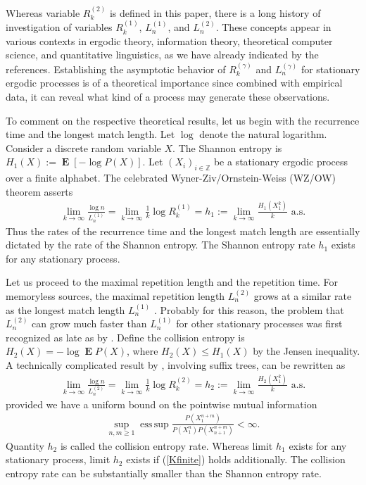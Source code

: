 \documentclass[a4paper]{article}
\newcommand{\kwad}[1]{\left[ #1 \right]}
\DeclareMathOperator{\esssup}{ess\, sup}
\DeclareMathOperator{\mean}{\mathbf{E}}
\begin{document}
Whereas variable $R^{(2)}_k$ is defined in this paper, there is a long
history of investigation of variables $R^{(1)}_k$, $L^{(1)}_n$, and
$L^{(2)}_n$. These concepts appear in various contexts in ergodic
theory, information theory, theoretical computer science, and
quantitative linguistics, as we have already indicated by the
references.  Establishing the asymptotic behavior of $R^{(\gamma)}_k$
and $L^{(\gamma)}_n$ for stationary ergodic processes is of a theoretical
importance since combined with empirical data, it can reveal what kind
of a process may generate these observations.

To comment on the respective theoretical results, let us begin with
the recurrence time and the longest match length.  Let $\log$ denote
the natural logarithm.  Consider a discrete random variable $X$. The
Shannon entropy is $H_1(X):=\mean\kwad{-\log P(X)}$. Let
$(X_i)_{i\in\mathbb{Z}}$ be a stationary ergodic process over a finite
alphabet. The celebrated Wyner-Ziv/Ornstein-Weiss (WZ/OW) theorem
\citep{WynerZiv89,OrnsteinWeiss93} asserts
\begin{align}
  \label{WZOW}
  \lim_{k\to\infty} \frac{\log n}{L^{(1)}_n}
  =\lim_{k\to\infty} \frac{1}{k}\log R^{(1)}_k
  =h_1:=\lim_{k\to\infty} \frac{H_1(X_1^k)}{k}
  \text{ a.s.}
\end{align}
Thus the rates of the recurrence time and the longest match length are
essentially dictated by the rate of the Shannon entropy.  The Shannon
entropy rate $h_1$ exists for any stationary process.

Let us proceed to the maximal repetition length and the repetition
time.  For memoryless sources, the maximal repetition length
$L^{(2)}_n$ grows at a similar rate as the longest match length
$L^{(1)}_n$ \citep{ErdosRenyi70,ArratiaWaterman89}. Probably for this
reason, the problem that $L^{(2)}_n$ can grow much faster than
$L^{(1)}_n$ for other stationary processes was first recognized as
late as by \citet{Shields92b,Shields97}. Define the collision entropy
is $H_2(X)=-\log\mean P(X)$, where $H_2(X)\le H_1(X)$ by the Jensen
inequality.  A technically complicated result by
\citet{Szpankowski93,Szpankowski93a}, involving suffix trees, can be
rewritten as
\begin{align}
  \label{Szpankowski}
  \lim_{k\to\infty} \frac{\log n}{L^{(2)}_n}
  =\lim_{k\to\infty} \frac{1}{k}\log R^{(2)}_k
  =h_2:=\lim_{k\to\infty} \frac{H_2(X_1^k)}{k}
  \text{ a.s.}
\end{align}
provided we have a uniform bound on the pointwise mutual information
\begin{align}
  \label{Kfinite}
  \sup_{n,m\ge 1}\esssup
     \frac{P(X_1^{n+m})}{P(X_1^n)P(X_{n+1}^{n+m})}
     < \infty.
\end{align}
Quantity $h_2$ is called the collision entropy rate. Whereas limit
$h_1$ exists for any stationary process, limit $h_2$ exists if
(\ref{Kfinite}) holds additionally. The collision entropy rate can be
substantially smaller than the Shannon entropy rate.
\end{document}
